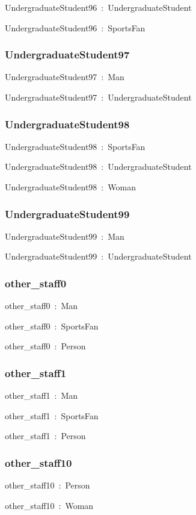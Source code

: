 \documentclass{article}
\begin{document}
UndergraduateStudent96~:~UndergraduateStudent

UndergraduateStudent96~:~SportsFan

\subsubsection*{UndergraduateStudent97}

UndergraduateStudent97~:~Man

UndergraduateStudent97~:~UndergraduateStudent

\subsubsection*{UndergraduateStudent98}

UndergraduateStudent98~:~SportsFan

UndergraduateStudent98~:~UndergraduateStudent

UndergraduateStudent98~:~Woman

\subsubsection*{UndergraduateStudent99}

UndergraduateStudent99~:~Man

UndergraduateStudent99~:~UndergraduateStudent

\subsubsection*{other\_staff0}

other\_staff0~:~Man

other\_staff0~:~SportsFan

other\_staff0~:~Person

\subsubsection*{other\_staff1}

other\_staff1~:~Man

other\_staff1~:~SportsFan

other\_staff1~:~Person

\subsubsection*{other\_staff10}

other\_staff10~:~Person

other\_staff10~:~Woman
\end{document}
